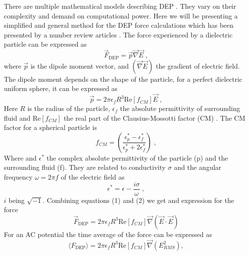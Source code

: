 \documentclass[final]{jyflluk}
\begin{document}
There are multiple mathematical models describing DEP \cite{jubery_dielectrophoretic_2014}. They vary on their complexity and demand on computational power. Here we will be presenting a simplified and general method for the DEP force calculations which has been presented by a number review articles \cite{cottet_mydep_2019, morgan_single_2007,li_review_2014,voldman_electrical_2006}. The force experienced by a dielectric particle can be expressed as
%
\begin{equation}
   \label{eq:F_dielec}
   \vec{F}_{\mathrm{DEP}} = \vec{p} \vec{\nabla} \vec{E}\;,
\end{equation}
%
where $\vec{p}$  is the dipole moment vector, and $(\vec{\nabla} \vec{E})$ the gradient of electric field. The dipole moment depends on the shape of the particle, for a perfect dielectric uniform sphere, it can be expressed as
%
\begin{equation}
   \label{eq:dipmoment}
   \vec{p} = 2 \pi \epsilon_f R^3 \mathrm{Re}[f_{CM}] \vec{E}\;,
\end{equation}
%
Here $R$ is the radius of the particle, $\epsilon_{f}$ the absolute permittivity of surrounding fluid and $\mathrm{Re}[f_{CM}]$ the real part of the Clausius-Mossotti factor (CM) \cite{li_review_2014}. The CM factor for a spherical particle is
%
\begin{equation}
   \label{eq:CM}
   f_{CM} = \left(\frac{\epsilon_{p}^* - \epsilon_{f}^*}{\epsilon_{p}^* + 2\epsilon_{f}^*} \right)\;,
\end{equation}
%
Where and $\epsilon^*$ the complex absolute permittivity of the particle (p) and the surrounding fluid (f). They are related to conductivity $\sigma$ and the angular frequency $\omega=2\pi f$ of the electric field as 
%
\begin{equation}
   \label{eq:complex}
   \epsilon^* = \epsilon - \frac{i \sigma}{\omega}\;,
\end{equation}
%
$i$ being $\sqrt{-1}$. Combining equations (1) and (2) we get and expression for the force
%
\begin{equation}
   \label{eq:F_DEP_norm}
   \vec{F}_{\mathrm{DEP}} = 2 \pi \epsilon_f R^3 \mathrm{Re}[f_{CM}] \vec{\nabla} (\vec{E} \cdot \vec{E}) 
\end{equation}
%
For an AC potential the time average of the force can be expressed as
%
\begin{equation}
   \label{eq:F_DEP}
   \langle F_{\mathrm{DEP}}\rangle = 2 \pi \epsilon_f R^3 \mathrm{Re}[f_{CM}] \vec{\nabla} (E^2_{RMS}) ,
\end{equation}
\end{document}
